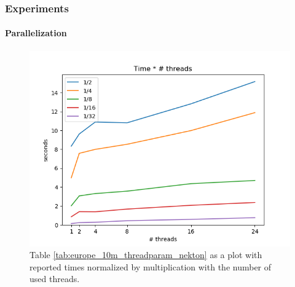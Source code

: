 \documentclass[10pt, t,
aspectratio=1610,%
]{beamer}
\newcommand{\traj}[2]{\mathcal{T}_{\text{#1},\text{#2}}}
\begin{document}
\begin{frame}
	\frametitle{Experiments}
	\framesubtitle{Parallelization}
	\begin{figure}
		\centering
		\includegraphics[width=\linewidth]{graphics/normalized_thread_times.png}
		\caption{Table \ref{tab:europe_10m_threadparam_nekton} as a plot with reported times normalized by multiplication with the number of used threads.}
		\label{fig:normalized_thread_times}
	\end{figure}
\end{frame}


\end{document}
